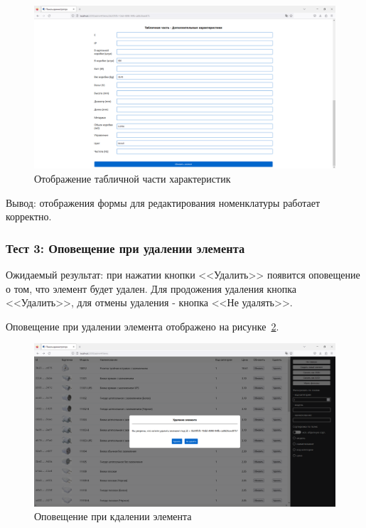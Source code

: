 \begin{figure}[!htb]\centering

    \includegraphics[width=14cm]
    {images/mobile/admin/tests/item_edit_2.png}

    \caption{Отображение табличной части характеристик}
    \label{fig:test_admin_item_edit_2}
\end{figure}

Вывод: отображения формы для редактирования номенклатуры работает корректно.

\subsubsection*{Тест 3: Оповещение при удалении элемента}

Ожидаемый результат: при нажатии кнопки <<Удалить>> появится оповещение о том, что элемент будет удален.
Для продожения удаления кнопка <<Удалить>>, для отмены удаления - кнопка <<Не удалять>>.

Оповещение при удалении элемента отображено на рисунке~\ref{fig:test_admin_item_on_delete}.

\begin{figure}[!htb]\centering

    \includegraphics[width=14cm]
    {images/mobile/admin/tests/item_on_delete.png}

    \caption{Оповещение при кдалении элемента}
    \label{fig:test_admin_item_on_delete}
\end{figure}

